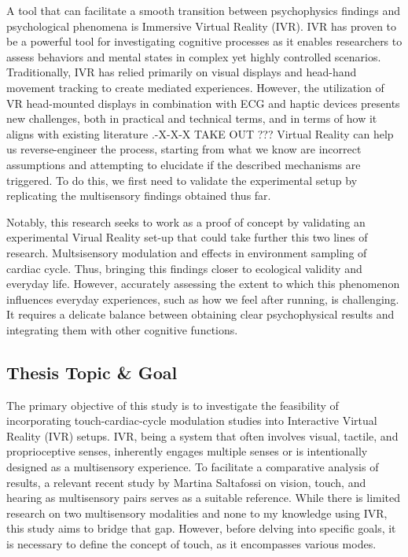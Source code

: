 \documentclass[12pt,oneside,openright]{report}
\begin{document}
A tool that can facilitate a smooth transition between psychophysics findings and psychological phenomena is Immersive Virtual Reality (IVR). IVR has proven to be a powerful tool for investigating cognitive processes as it enables researchers to assess behaviors and mental states in complex yet highly controlled scenarios. Traditionally, IVR has relied primarily on visual displays and head-hand movement tracking to create mediated experiences. However, the utilization of VR head-mounted displays in combination with ECG and haptic devices presents new challenges, both in practical and technical terms, and in terms of how it aligns with existing literature \parencite{Klotzsche2023}.-X-X-X TAKE OUT ??? Virtual Reality can help us reverse-engineer the process, starting from what we know are incorrect assumptions and attempting to elucidate if the described mechanisms are triggered. To do this, we first need to validate the experimental setup by replicating the multisensory findings obtained thus far.

Notably, this research seeks to work as a proof of concept by validating an experimental Virual Reality set-up that could take further this two lines of research. Multsisensory modulation and effects in environment sampling of cardiac cycle. Thus, bringing this findings closer to ecological validity and everyday life. However, accurately assessing the extent to which this phenomenon influences everyday experiences, such as how we feel after running, is challenging. It requires a delicate balance between obtaining clear psychophysical results and integrating them with other cognitive functions.

\subsection*{Thesis Topic \& Goal}

The primary objective of this study is to investigate the feasibility of incorporating touch-cardiac-cycle modulation studies into Interactive Virtual Reality (IVR) setups. IVR, being a system that often involves visual, tactile, and proprioceptive senses, inherently engages multiple senses or is intentionally designed as a multisensory experience. To facilitate a comparative analysis of results, a relevant recent study by Martina Saltafossi on vision, touch, and hearing as multisensory pairs \cite{SALTAFOSSI2023108642} serves as a suitable reference. While there is limited research on two multisensory modalities and none to my knowledge using IVR, this study aims to bridge that gap. However, before delving into specific goals, it is necessary to define the concept of touch, as it encompasses various modes.
\end{document}
